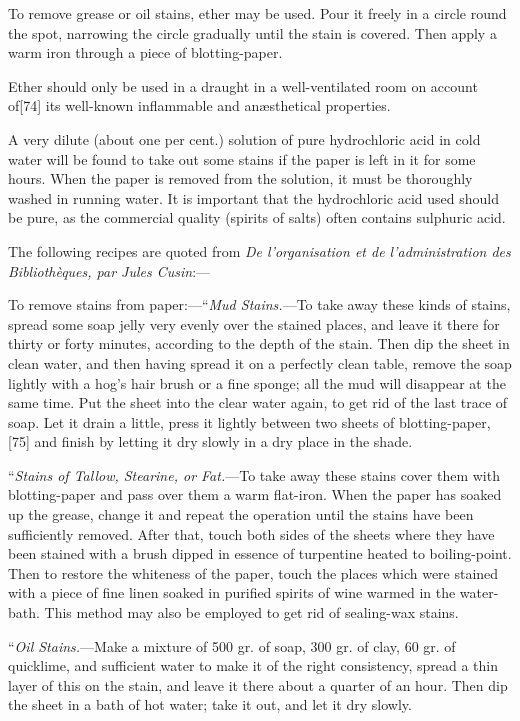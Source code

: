 \documentclass[
]{article}
\begin{document}
To remove grease or oil stains, ether may be used. Pour it freely in a
circle round the spot, narrowing the circle gradually until the stain is
covered. Then apply a warm iron through a piece of blotting-paper.

Ether should only be used in a draught in a well-ventilated room on
account of{\protect\hypertarget{Page_74}{}{{[}74{]}}} its well-known
inflammable and anæsthetical properties.

A very dilute (about one per cent.) solution of pure hydrochloric acid
in cold water will be found to take out some stains if the paper is left
in it for some hours. When the paper is removed from the solution, it
must be thoroughly washed in running water. It is important that the
hydrochloric acid used should be pure, as the commercial quality
(spirits of salts) often contains sulphuric acid.

The following recipes are quoted from \emph{De l'organisation et de
l'administration des Bibliothèques, par Jules Cusin}:---

To remove stains from paper:---``\emph{Mud Stains.}---To take away these
kinds of stains, spread some soap jelly very evenly over the stained
places, and leave it there for thirty or forty minutes, according to the
depth of the stain. Then dip the sheet in clean water, and then having
spread it on a perfectly clean table, remove the soap lightly with a
hog's hair brush or a fine sponge; all the mud will disappear at the
same time. Put the sheet into the clear water again, to get rid of the
last trace of soap. Let it drain a little, press it lightly between two
sheets of blotting-paper,{\protect\hypertarget{Page_75}{}{{[}75{]}}} and
finish by letting it dry slowly in a dry place in the shade.

``\emph{Stains of Tallow, Stearine, or Fat.}---To take away these stains
cover them with blotting-paper and pass over them a warm flat-iron. When
the paper has soaked up the grease, change it and repeat the operation
until the stains have been sufficiently removed. After that, touch both
sides of the sheets where they have been stained with a brush dipped in
essence of turpentine heated to boiling-point. Then to restore the
whiteness of the paper, touch the places which were stained with a piece
of fine linen soaked in purified spirits of wine warmed in the
water-bath. This method may also be employed to get rid of sealing-wax
stains.

``\emph{Oil Stains.}---Make a mixture of 500 gr. of soap, 300 gr. of
clay, 60 gr. of quicklime, and sufficient water to make it of the right
consistency, spread a thin layer of this on the stain, and leave it
there about a quarter of an hour. Then dip the sheet in a bath of hot
water; take it out, and let it dry slowly.
\end{document}
